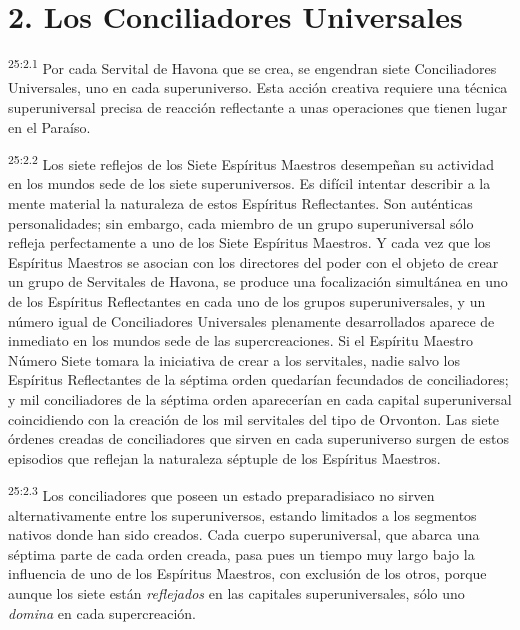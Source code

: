 \section*{2. Los Conciliadores Universales}
\par
\textsuperscript{25:2.1} Por cada Servital de Havona que se crea, se engendran siete Conciliadores Universales, uno en cada superuniverso. Esta acción creativa requiere una técnica superuniversal precisa de reacción reflectante a unas operaciones que tienen lugar en el Paraíso.

\par
\textsuperscript{25:2.2} Los siete reflejos de los Siete Espíritus Maestros desempeñan su actividad en los mundos sede de los siete superuniversos. Es difícil intentar describir a la mente material la naturaleza de estos Espíritus Reflectantes. Son auténticas personalidades; sin embargo, cada miembro de un grupo superuniversal sólo refleja perfectamente a uno de los Siete Espíritus Maestros. Y cada vez que los Espíritus Maestros se asocian con los directores del poder con el objeto de crear un grupo de Servitales de Havona, se produce una focalización simultánea en uno de los Espíritus Reflectantes en cada uno de los grupos superuniversales, y un número igual de Conciliadores Universales plenamente desarrollados aparece de inmediato en los mundos sede de las supercreaciones. Si el Espíritu Maestro Número Siete tomara la iniciativa de crear a los servitales, nadie salvo los Espíritus Reflectantes de la séptima orden quedarían fecundados de conciliadores; y mil conciliadores de la séptima orden aparecerían en cada capital superuniversal coincidiendo con la creación de los mil servitales del tipo de Orvonton. Las siete órdenes creadas de conciliadores que sirven en cada superuniverso surgen de estos episodios que reflejan la naturaleza séptuple de los Espíritus Maestros.

\par
\textsuperscript{25:2.3} Los conciliadores que poseen un estado preparadisiaco no sirven alternativamente entre los superuniversos, estando limitados a los segmentos nativos donde han sido creados. Cada cuerpo superuniversal, que abarca una séptima parte de cada orden creada, pasa pues un tiempo muy largo bajo la influencia de uno de los Espíritus Maestros, con exclusión de los otros, porque aunque los siete están \textit{reflejados} en las capitales superuniversales, sólo uno \textit{domina} en cada supercreación.

